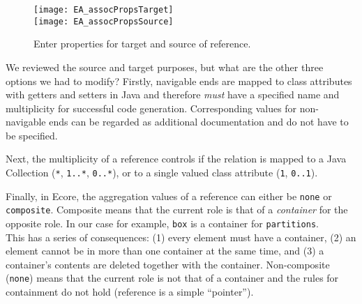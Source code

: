 \begin{itemize}
\vspace{0.5cm}

\begin{figure}[htbp]
	\centering
	  \texttt{[image: EA\_assocPropsTarget]}\\
  \vspace{0.5cm}
    \texttt{[image: EA\_assocPropsSource]}
	\caption{Enter properties for target and source of reference.}
	\label{fig:reference_ends}
\end{figure}
\FloatBarrier

\end{itemize}

We reviewed the source and target purposes, but what are the other three options we had to modify? Firstly, navigable ends are mapped to class attributes with getters and setters in Java and therefore \emph{must} have a specified name and  multiplicity for successful code generation. Corresponding values for non-navigable ends can  be regarded as additional documentation and do not have to be specified.

Next, the multiplicity of a reference controls if the relation is mapped to a Java Collection (\texttt{*},  \texttt{1..*}, \texttt{0..*}), or to a single valued class attribute (\texttt{1}, \texttt{0..1}).

Finally, in Ecore, the aggregation values of a reference can either be \texttt{none} or \texttt{com\-po\-site}.
Composite means that the current role is that of a \emph{container} for the opposite role.
In our case for example, \texttt{box} is a container for \texttt{partitions}.\\
This has a series of consequences: (1) every element must have a container, (2) an element cannot be in more than one container at the same time, and (3) a container's contents are deleted together with the container.
Non-composite (\texttt{none}) means that the current role is not that of a container and the rules for containment do not hold (reference is a simple ``pointer'').

